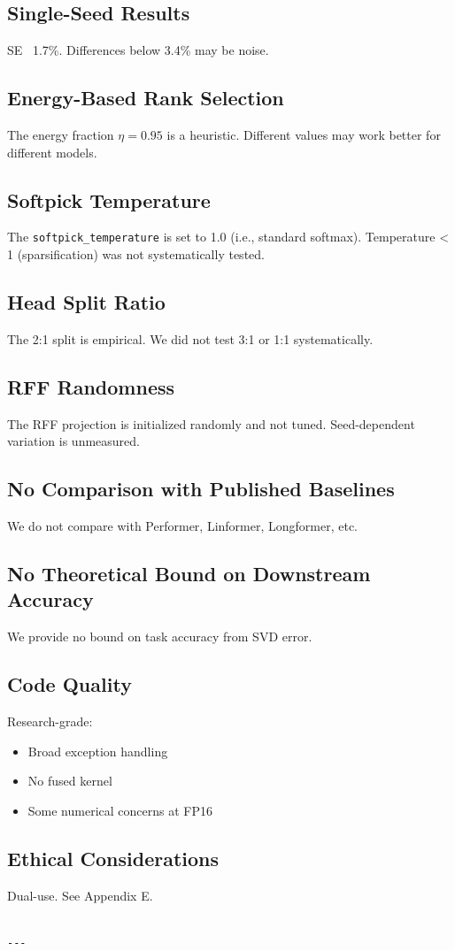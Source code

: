 \subsection{Single-Seed Results}

SE ~1.7\%. Differences below 3.4\% may be noise.

\subsection{Energy-Based Rank Selection}

The energy fraction $\eta = 0.95$ is a heuristic. Different values may 
work better for different models.

\subsection{Softpick Temperature}

The \texttt{softpick\_temperature} is set to 1.0 (i.e., standard softmax). 
Temperature \textless{} 1 (sparsification) was not systematically tested.

\subsection{Head Split Ratio}

The 2:1 split is empirical. We did not test 3:1 or 1:1 systematically.

\subsection{RFF Randomness}

The RFF projection is initialized randomly and not tuned. Seed-dependent 
variation is unmeasured.

\subsection{No Comparison with Published Baselines}

We do not compare with Performer, Linformer, Longformer, etc.

\subsection{No Theoretical Bound on Downstream Accuracy}

We provide no bound on task accuracy from SVD error.

\subsection{Code Quality}

Research-grade:
\begin{itemize}
\item Broad exception handling
\item No fused kernel
\item Some numerical concerns at FP16

\end{itemize}
\subsection{Ethical Considerations}

Dual-use. See Appendix E.
\begin{lstlisting}

---
\end{lstlisting}